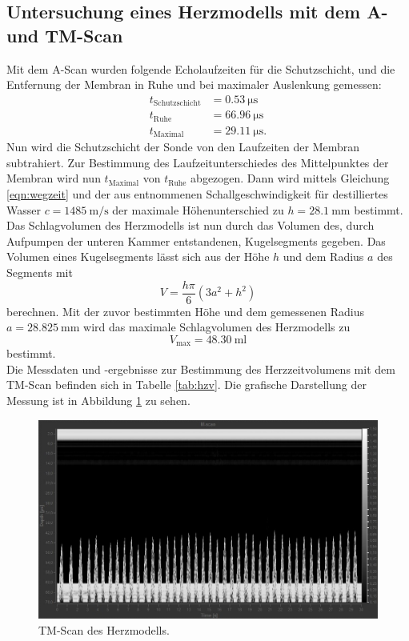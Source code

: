 \FloatBarrier
\subsection{Untersuchung eines Herzmodells mit dem A- und TM-Scan}
Mit dem A-Scan wurden folgende Echolaufzeiten für die Schutzschicht, und die Entfernung der Membran in Ruhe und bei maximaler Auslenkung gemessen:
\begin{align*}
  t_\text{Schutzschicht} &= \SI{0.53}{\micro\second} \\
  t_\text{Ruhe} &= \SI{66.96}{\micro\second} \\
  t_\text{Maximal} &= \SI{29.11}{\micro\second} .
\end{align*}
Nun wird die Schutzschicht der Sonde von den Laufzeiten der Membran subtrahiert. Zur Bestimmung des Laufzeitunterschiedes des Mittelpunktes der Membran wird
nun $t_\text{Maximal}$ von $t_\text{Ruhe}$ abgezogen. Dann wird mittels Gleichung \eqref{eqn:wegzeit} und der aus \cite{wasser} entnommenen Schallgeschwindigkeit
für destilliertes Wasser $c=\SI{1485}{\metre\per\second}$ der maximale Höhenunterschied zu $h=\SI{28.1}{\milli\metre}$ bestimmt.
Das Schlagvolumen des Herzmodells ist nun durch das Volumen des, durch Aufpumpen der unteren Kammer entstandenen, Kugelsegments gegeben.
Das Volumen eines Kugelsegments lässt sich aus der Höhe $h$ und dem Radius $a$ des Segments mit
\begin{equation}
  V = \frac{h \pi}{6} (3a^2+h^2)
  \label{eqn:herzvol}
\end{equation}
berechnen. Mit der zuvor bestimmten Höhe und dem gemessenen Radius $a=\SI{28.825}{\milli\metre}$ wird das maximale Schlagvolumen des Herzmodells zu
\begin{equation*}
  V_\text{max}= \SI{48.30}{\milli\litre}
\end{equation*}
bestimmt.
\\
Die Messdaten und -ergebnisse zur Bestimmung des Herzzeitvolumens mit dem TM-Scan befinden sich in Tabelle \ref{tab:hzv}. Die grafische Darstellung der Messung ist in Abbildung
\ref{fig:hzv} zu sehen.
\begin{figure}
  \centering
  \includegraphics[scale=0.4]{images/herzreal.jpg}
  \caption{TM-Scan des Herzmodells.}
  \label{fig:hzv}
\end{figure}
